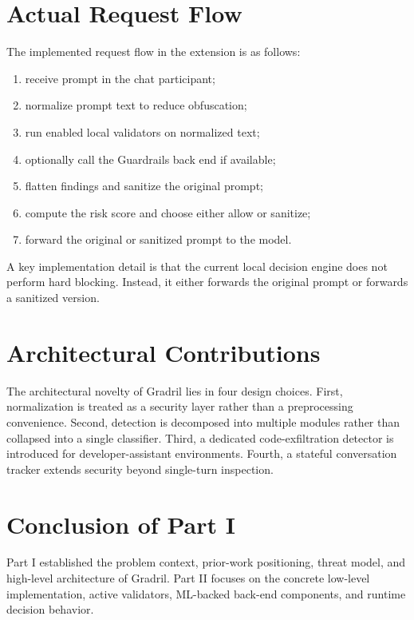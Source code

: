 \documentclass[journal]{IEEEtran}
\begin{document}
\section{Actual Request Flow}
The implemented request flow in the extension is as follows:
\begin{enumerate}
    \item receive prompt in the chat participant;
    \item normalize prompt text to reduce obfuscation;
    \item run enabled local validators on normalized text;
    \item optionally call the Guardrails back end if available;
    \item flatten findings and sanitize the original prompt;
    \item compute the risk score and choose either allow or sanitize;
    \item forward the original or sanitized prompt to the model.
\end{enumerate}

A key implementation detail is that the current local decision engine does not perform hard blocking. Instead, it either forwards the original prompt or forwards a sanitized version.

\section{Architectural Contributions}
The architectural novelty of Gradril lies in four design choices. First, normalization is treated as a security layer rather than a preprocessing convenience. Second, detection is decomposed into multiple modules rather than collapsed into a single classifier. Third, a dedicated code-exfiltration detector is introduced for developer-assistant environments. Fourth, a stateful conversation tracker extends security beyond single-turn inspection.

\section{Conclusion of Part I}
Part I established the problem context, prior-work positioning, threat model, and high-level architecture of Gradril. Part II focuses on the concrete low-level implementation, active validators, ML-backed back-end components, and runtime decision behavior.
\end{document}
